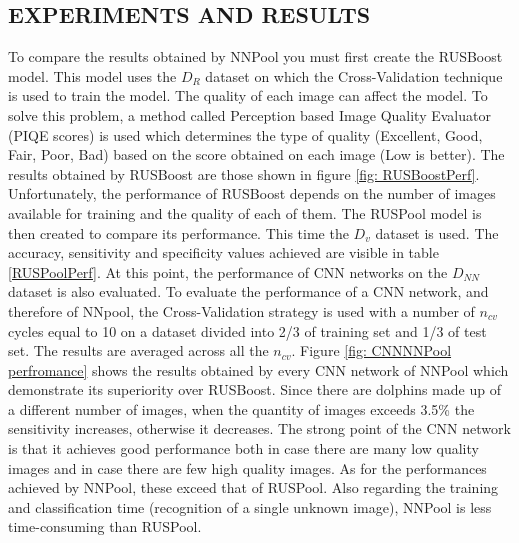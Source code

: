 \subsection{EXPERIMENTS AND RESULTS}
To compare the results obtained by NNPool you must first create the RUSBoost 
model. This model uses the $D_R$ dataset on which the Cross-Validation 
technique is used to train the model. The quality of each image can affect 
the model. To solve this problem, a method called Perception based Image 
Quality Evaluator (PIQE scores) is used which determines the type of quality 
(Excellent, Good, Fair, Poor, Bad) based on the score obtained on each 
image (Low is better). The results obtained by RUSBoost are those shown 
in figure \ref{fig: RUSBoostPerf}. Unfortunately, the performance of RUSBoost depends on 
the number of images available for training and the quality of each of them. The 
RUSPool model is then created to compare its performance. This time the 
$D_v$ dataset is used. The accuracy, sensitivity and specificity values achieved 
are visible in table \ref{RUSPoolPerf}. At this point, the performance of CNN networks on 
the $D_{NN}$ dataset is also evaluated. To evaluate the performance of a CNN 
network, and therefore of NNpool, the Cross-Validation strategy is used with 
a number of $n_{cv}$ cycles equal to 10 on a dataset divided into 2/3 of training 
set and 1/3 of test set. The results are averaged across all the $n_{cv}$. Figure \ref{fig: CNNNNPool perfromance} 
shows the results obtained by every CNN network of NNPool which demonstrate 
its superiority over RUSBoost. Since there are dolphins made up of 
a different number of images, when the quantity of images exceeds 3.5\% the 
sensitivity increases, otherwise it decreases. The strong point of the CNN 
network is that it achieves good performance both in case there are many 
low quality images and in case there are few high quality images. As for the 
performances achieved by NNPool, these exceed that of RUSPool. Also regarding 
the training and classification time (recognition of a single unknown 
image), NNPool is less time-consuming than RUSPool.
